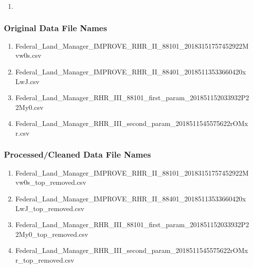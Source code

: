 \begin{enumerate}
\item 
\end{enumerate}

\subsubsection*{Original Data File Names}

\begin{enumerate}
\item Federal\_Land\_Manager\_IMPROVE\_RHR\_II\_88101\_20183151757452922Mvw0s.csv
\item Federal\_Land\_Manager\_IMPROVE\_RHR\_II\_88401\_20185113533660420xLwJ.csv
\item  Federal\_Land\_Manager\_RHR\_III\_88101\_first\_param\_201851152033932P22My0.csv
\item Federal\_Land\_Manager\_RHR\_III\_second\_param\_2018511545575622rOMxr.csv
\end{enumerate}

\subsubsection*{Processed/Cleaned Data File Names}

\begin{enumerate}
\item Federal\_Land\_Manager\_IMPROVE\_RHR\_II\_88101\_20183151757452922Mvw0s\_top\_removed.csv
\item Federal\_Land\_Manager\_IMPROVE\_RHR\_II\_88401\_20185113533660420xLwJ\_top\_removed.csv
\item Federal\_Land\_Manager\_RHR\_III\_88101\_first\_param\_201851152033932P22My0\_top\_removed.csv
\item Federal\_Land\_Manager\_RHR\_III\_second\_param\_2018511545575622rOMxr\_top\_removed.csv
\end{enumerate}
